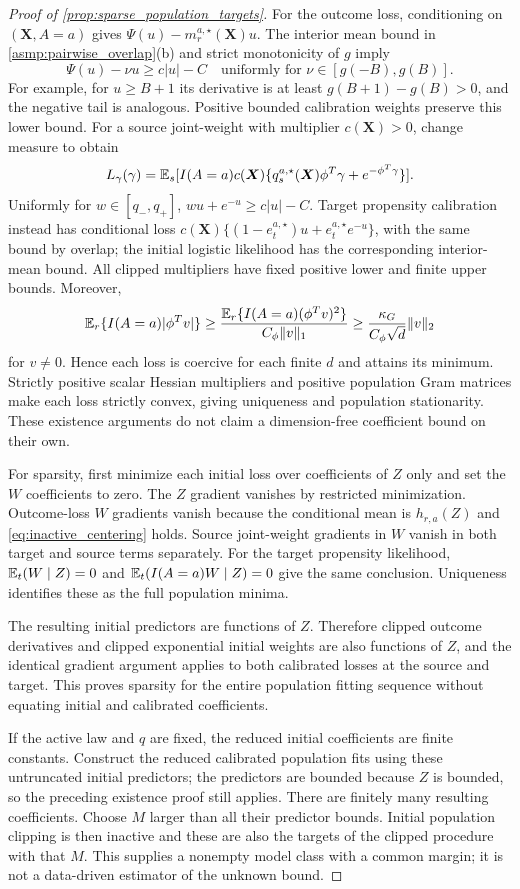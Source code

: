 \documentclass[12pt]{article}
\begin{document}
\begin{proof}[Proof of \cref{prop:sparse_population_targets}]
For the outcome loss, conditioning on $(\boldsymbol X,A=a)$ gives $\Psi(u)-m_r^{a,\star}(\boldsymbol X)u$. The interior mean bound in \cref{asmp:pairwise_overlap}(b) and strict monotonicity of $g$ imply
\[
\Psi(u)-\nu u\ge c|u|-C
\quad\text{uniformly for }\nu\in[g(-B),g(B)].
\]
For example, for $u\ge B+1$ its derivative is at least $g(B+1)-g(B)>0$, and the negative tail is analogous. Positive bounded calibration weights preserve this lower bound. For a source joint-weight with multiplier $c(\boldsymbol X)>0$, change measure to obtain
\[
L_\gamma(\gamma)=\mathbb{E}_s[I(A=a) c(\boldsymbol X)\{q_s^{a,\star}(\boldsymbol X)\phi^T\gamma+e^{-\phi^T\gamma}\}].
\]
Uniformly for $w\in[q_-,q_+]$, $wu+e^{-u}\ge c|u|-C$. Target propensity calibration instead has conditional loss $c(\boldsymbol X)\{(1-e_t^{a,\star})u+e_t^{a,\star}e^{-u}\}$, with the same bound by overlap; the initial logistic likelihood has the corresponding interior-mean bound. All clipped multipliers have fixed positive lower and finite upper bounds. Moreover,
\[
\mathbb{E}_r\{I(A=a)|\phi^Tv|\}
\ge\frac{\mathbb{E}_r\{I(A=a)(\phi^Tv)^2\}}{C_\phi\|v\|_1}
\ge\frac{\kappa_G}{C_\phi\sqrt d}\|v\|_2
\]
for $v\ne0$. Hence each loss is coercive for each finite $d$ and attains its minimum. Strictly positive scalar Hessian multipliers and positive population Gram matrices make each loss strictly convex, giving uniqueness and population stationarity. These existence arguments do not claim a dimension-free coefficient bound on their own.

For sparsity, first minimize each initial loss over coefficients of $Z$ only and set the $W$ coefficients to zero. The $Z$ gradient vanishes by restricted minimization. Outcome-loss $W$ gradients vanish because the conditional mean is $h_{r,a}(Z)$ and \cref{eq:inactive_centering} holds. Source joint-weight gradients in $W$ vanish in both target and source terms separately. For the target propensity likelihood, $\mathbb{E}_t(W\mid Z)=0$ and $\mathbb{E}_t(I(A=a)W\mid Z)=0$ give the same conclusion. Uniqueness identifies these as the full population minima.

The resulting initial predictors are functions of $Z$. Therefore clipped outcome derivatives and clipped exponential initial weights are also functions of $Z$, and the identical gradient argument applies to both calibrated losses at the source and target. This proves sparsity for the entire population fitting sequence without equating initial and calibrated coefficients.

If the active law and $q$ are fixed, the reduced initial coefficients are finite constants. Construct the reduced calibrated population fits using these untruncated initial predictors; the predictors are bounded because $Z$ is bounded, so the preceding existence proof still applies. There are finitely many resulting coefficients. Choose $M$ larger than all their predictor bounds. Initial population clipping is then inactive and these are also the targets of the clipped procedure with that $M$. This supplies a nonempty model class with a common margin; it is not a data-driven estimator of the unknown bound.
\end{proof}
\end{document}
